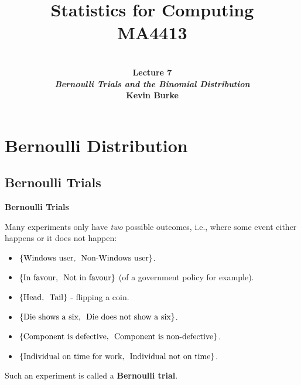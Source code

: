 \documentclass[compress]{beamer}        %
\title{{\huge Statistics for Computing\\[0.1cm]MA4413}}
\author[Kevin Burke]{{\bf\\[0.5cm]{\huge Lecture 7}\\[0.2cm]\emph{Bernoulli Trials and the Binomial Distribution}\\[1.4cm]Kevin Burke}\\[0.3cm]\tcb{kevin.burke@ul.ie}}
\institute[University of Limerick, Maths \& Stats Dept]{}
\date{}
\makeatletter
\newcommand{\tcb}{\textcolor{beamer@blendedblue}}
\makeatother
\begin{document}
\begin{frame}[t]
\titlepage
\end{frame}

\section{Bernoulli Distribution}
\subsection{Bernoulli Trials}
\begin{frame}{\bf \tcb{Bernoulli Trials}}

Many experiments only have \emph{two} possible outcomes, i.e., where some event either happens or it does not happen:\\[0.2cm]
\begin{itemize}\itemsep0.3cm
\item $\{\text{Windows user,\,\, Non-Windows user}\}$.
\item $\{\text{In favour,\,\, Not in favour}\}$ (of a government policy for example).
\item $\{\text{Head,\,\, Tail}\}$ - flipping a coin.
\item $\{\text{Die shows a six,\,\, Die does not show a six}\}$.
\item $\{\text{Component is defective,\,\, Component is non-defective}\}$.
\item $\{\text{Individual on time for work,\,\, Individual not on time}\}$.\\[0.4cm]
\end{itemize}

Such an experiment is called a {\bf Bernoulli trial}.

\end{frame}
\end{document}
